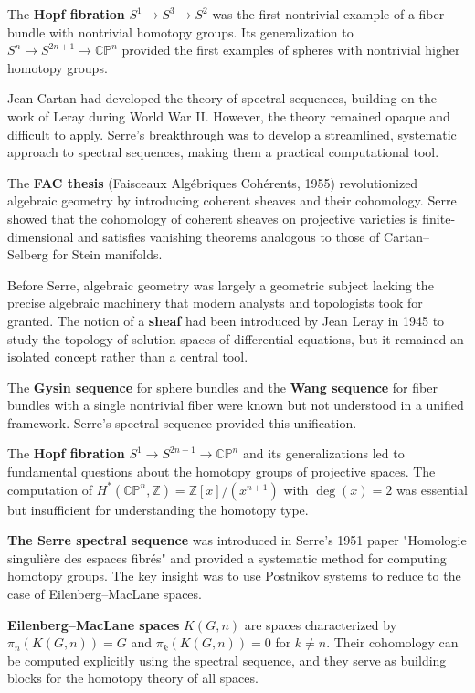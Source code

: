 The \textbf{Hopf fibration} $S^1 \to S^3 \to S^2$ was the first nontrivial example of a fiber bundle with nontrivial homotopy groups. Its generalization to $S^n \to S^{2n+1} \to \mathbb{CP}^n$ provided the first examples of spheres with nontrivial higher homotopy groups.

Jean Cartan had developed the theory of spectral sequences, building on the work of Leray during World War II. However, the theory remained opaque and difficult to apply. Serre's breakthrough was to develop a streamlined, systematic approach to spectral sequences, making them a practical computational tool.

The \textbf{FAC thesis} (Faisceaux Algébriques Cohérents, 1955) revolutionized algebraic geometry by introducing coherent sheaves and their cohomology. Serre showed that the cohomology of coherent sheaves on projective varieties is finite-dimensional and satisfies vanishing theorems analogous to those of Cartan--Selberg for Stein manifolds.

Before Serre, algebraic geometry was largely a geometric subject lacking the precise algebraic machinery that modern analysts and topologists took for granted. The notion of a \textbf{sheaf} had been introduced by Jean Leray in 1945 to study the topology of solution spaces of differential equations, but it remained an isolated concept rather than a central tool.

The \textbf{Gysin sequence} for sphere bundles and the \textbf{Wang sequence} for fiber bundles with a single nontrivial fiber were known but not understood in a unified framework. Serre's spectral sequence provided this unification.

The \textbf{Hopf fibration} $S^1 \to S^{2n+1} \to \mathbb{CP}^n$ and its generalizations led to fundamental questions about the homotopy groups of projective spaces. The computation of $H^*(\mathbb{CP}^n, \mathbb{Z}) = \mathbb{Z}[x]/(x^{n+1})$ with $\deg(x) = 2$ was essential but insufficient for understanding the homotopy type.

\textbf{The Serre spectral sequence} was introduced in Serre's 1951 paper "Homologie singulière des espaces fibrés" and provided a systematic method for computing homotopy groups. The key insight was to use Postnikov systems to reduce to the case of Eilenberg--MacLane spaces.

\textbf{Eilenberg--MacLane spaces} $K(G, n)$ are spaces characterized by $\pi_n(K(G,n)) = G$ and $\pi_k(K(G,n)) = 0$ for $k \neq n$. Their cohomology can be computed explicitly using the spectral sequence, and they serve as building blocks for the homotopy theory of all spaces.

